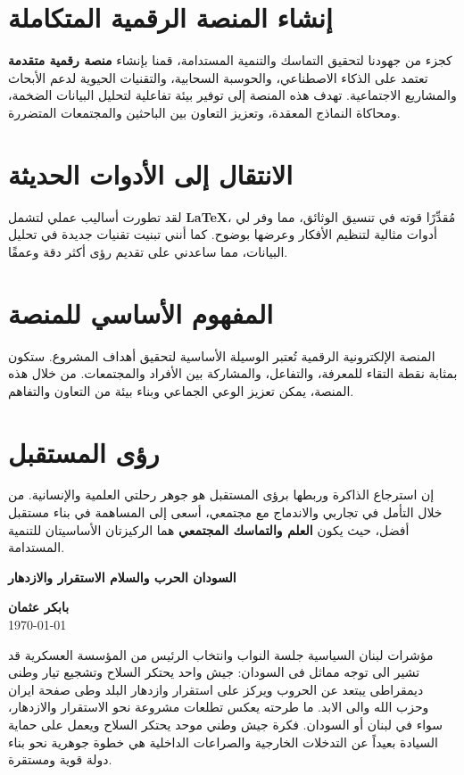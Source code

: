 \documentclass[12pt]{article}
\begin{document}
\section{إنشاء المنصة الرقمية المتكاملة}
كجزء من جهودنا لتحقيق التماسك والتنمية المستدامة، قمنا بإنشاء \textbf{منصة رقمية متقدمة} تعتمد على الذكاء الاصطناعي، والحوسبة السحابية، والتقنيات الحيوية لدعم الأبحاث والمشاريع الاجتماعية.  
تهدف هذه المنصة إلى توفير بيئة تفاعلية لتحليل البيانات الضخمة، ومحاكاة النماذج المعقدة، وتعزيز التعاون بين الباحثين والمجتمعات المتضررة.

\section{الانتقال إلى الأدوات الحديثة}
لقد تطورت أساليب عملي لتشمل \textbf{LaTeX}، مُقدِّرًا قوته في تنسيق الوثائق، مما وفر لي أدوات مثالية لتنظيم الأفكار وعرضها بوضوح.  
كما أنني تبنيت تقنيات جديدة في تحليل البيانات، مما ساعدني على تقديم رؤى أكثر دقة وعمقًا.

\section{\textcolor{sectionColor}{المفهوم الأساسي للمنصة}} المنصة الإلكترونية الرقمية تُعتبر الوسيلة الأساسية لتحقيق أهداف المشروع. ستكون بمثابة نقطة التقاء للمعرفة، والتفاعل، والمشاركة بين الأفراد والمجتمعات. من خلال هذه المنصة، يمكن تعزيز الوعي الجماعي وبناء بيئة من التعاون والتفاهم.
\section{\textcolor{sectionColor}{رؤى المستقبل}}
إن استرجاع الذاكرة وربطها برؤى المستقبل هو جوهر رحلتي العلمية والإنسانية.  
من خلال التأمل في تجاربي والاندماج مع مجتمعي، أسعى إلى المساهمة في بناء مستقبل أفضل، حيث يكون \textbf{العلم والتماسك المجتمعي} هما الركيزتان الأساسيتان للتنمية المستدامة.




\begin{center}
    {\Huge\textbf{\textcolor{titleColor}{ السودان  الحرب والسلام الاستقرار والازدهار }}}
    \vspace{0.5cm}

    \textbf{\textcolor{emphasisColor}{بابكر عثمان}} \\
    \vspace{0.2cm}
    \today
\end{center}

مؤشرات لبنان السياسية جلسة النواب وانتخاب الرئيس من المؤسسة العسكرية قد تشير الى توجه مماثل فى السودان: جيش واحد يحتكر السلاح وتشجيع تيار وطنى ديمقراطى يبتعد عن الحروب ويركز على استقرار وازدهار البلد وطى صفحة ايران وحزب الله والى الابد. ما طرحته يعكس تطلعات مشروعة نحو الاستقرار والازدهار، سواء في لبنان أو السودان. فكرة جيش وطني موحد يحتكر السلاح ويعمل على حماية السيادة بعيداً عن التدخلات الخارجية والصراعات الداخلية هي خطوة جوهرية نحو بناء دولة قوية ومستقرة.
\end{document}
